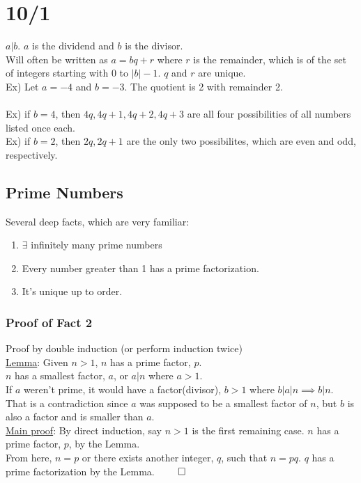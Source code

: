 \documentclass[13pt]{article}
\begin{document}
\section*{10/1}
	$a | b$. $a$ is the dividend and $b$ is the divisor.\\
	Will often be written as $a = bq + r$ where $r$ is the remainder, which
	is of the set of integers starting with 0 to $|b|-1$. $q$ and $r$ are
	unique.\\
	Ex) Let $a = -4$ and $b = -3$. The quotient is 2 with remainder 2. \\\\
	Ex) if $b = 4$, then $4q, 4q +1, 4q + 2, 4q + 3$ are all four possibilities
	of all numbers listed once each. \\
	Ex) if $b = 2$, then $2q, 2q+1$ are the only two possibilites, which are
	even and odd, respectively. \\

	\subsection*{Prime Numbers}
		Several deep facts, which are very familiar:
		\begin{enumerate}
			\item $\exists$ infinitely many prime numbers
			\item Every number greater than 1 has a prime factorization.
			\item It's unique up to order.
		\end{enumerate}
		\subsubsection*{Proof of Fact 2}
		Proof by double induction (or perform induction 
		twice)\\
		\underline{Lemma}: Given $n > 1$, $n$ has a prime factor, $p$. \\
		$n$ has a smallest factor, $a$, or $a | n$ where $a > 1$.\\
		If $a$ weren't prime, it would have a factor(divisor), $b > 1$ where 
		$b | a | n \implies b | n$. That is a contradiction since $a$ was
		supposed to be a smallest factor of $n$, but $b$ is also a factor
		and is smaller than $a$.\\
		\underline{Main proof}: By direct induction, say $n > 1$ is the first 
		remaining case. $n$ has a prime factor, $p$, by the Lemma.\\
		From here, $n = p$ or there exists another integer, $q$, such that
		$n = pq$. $q$ has a prime factorization by the Lemma. $\qed$
\end{document}
